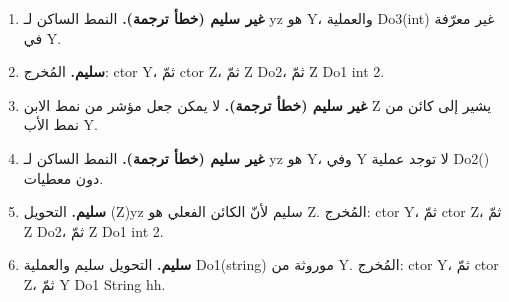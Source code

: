 \begin{boxSolution}
\begin{enumerate}[label=\textbf{\arabic*.}, start=7, itemsep=0.35em]
    \item \textbf{غير سليم (خطأ ترجمة).} النمط الساكن لـ \textenglish{yz} هو \textenglish{Y}، والعملية \textenglish{Do3(int)} غير معرّفة في \textenglish{Y}.
    \item \textbf{سليم.} المُخرج: \textenglish{ctor Y}، ثمّ \textenglish{ctor Z}، ثمّ \textenglish{Z Do2}، ثمّ \textenglish{Z Do1 int 2}.
    \item \textbf{غير سليم (خطأ ترجمة).} لا يمكن جعل مؤشر من نمط الابن \textenglish{Z} يشير إلى كائن من نمط الأب \textenglish{Y}.
    \item \textbf{غير سليم (خطأ ترجمة).} النمط الساكن لـ \textenglish{yz} هو \textenglish{Y}، وفي \textenglish{Y} لا توجد عملية \textenglish{Do2()} دون معطيات.
    \item \textbf{سليم.} التحويل \textenglish{(Z)yz} سليم لأنّ الكائن الفعلي هو \textenglish{Z}. المُخرج: \textenglish{ctor Y}، ثمّ \textenglish{ctor Z}، ثمّ \textenglish{Z Do2}، ثمّ \textenglish{Z Do1 int 2}.
    \item \textbf{سليم.} التحويل سليم والعملية \textenglish{Do1(string)} موروثة من \textenglish{Y}. المُخرج: \textenglish{ctor Y}، ثمّ \textenglish{ctor Z}، ثمّ \textenglish{Y Do1 String hh}.
\end{enumerate}
\end{boxSolution}
\fi
\filbreak
